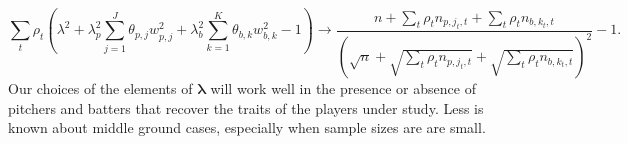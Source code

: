 \documentclass[12pt]{article}
\newcommand{\lambdabf}{\boldsymbol{\lambda}}
\begin{document}
$$
  \sum_t\rho_t\left(\lambda^2 + \lambda_p^2 \sum_{j=1}^J \theta_{p,j}w_{p,j}^2
    + \lambda_b^2 \sum_{k=1}^K \theta_{b,k}w_{b,k}^2 - 1\right) \longrightarrow
    \frac{n + \sum_t\rho_tn_{p,j_t,t} + \sum_t\rho_tn_{b,k_t,t}}
      {(\sqrt{n}
        + \sqrt{\sum_t\rho_tn_{p,j_t,t}} + \sqrt{\sum_t\rho_tn_{b,k_t,t}})^2} - 1.
$$
Our choices of the elements of $\lambdabf$ will work well in the presence or absence of pitchers and batters that recover the traits of the players under study. Less is known about middle ground cases, especially when sample sizes are are small.



\end{document}
